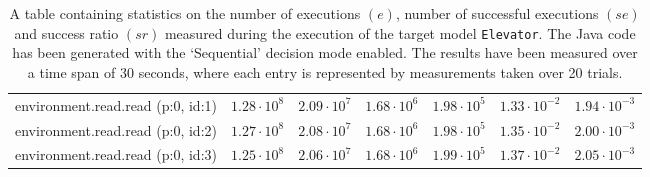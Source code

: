 \begin{table}[htbp]
{\begin{tabular}{lrrrrrr}
\hspace{3mm}environment.read.read (p:0, id:1) & $1.28 \cdot 10^{8}$ & $2.09 \cdot 10^{7}$ & $1.68 \cdot 10^{6}$ & $1.98 \cdot 10^{5}$ & $1.33 \cdot 10^{-2}$ & $1.94 \cdot 10^{-3}$ \\
\hspace{3mm}environment.read.read (p:0, id:2) & $1.27 \cdot 10^{8}$ & $2.08 \cdot 10^{7}$ & $1.68 \cdot 10^{6}$ & $1.98 \cdot 10^{5}$ & $1.35 \cdot 10^{-2}$ & $2.00 \cdot 10^{-3}$ \\
\hspace{3mm}environment.read.read (p:0, id:3) & $1.25 \cdot 10^{8}$ & $2.06 \cdot 10^{7}$ & $1.68 \cdot 10^{6}$ & $1.99 \cdot 10^{5}$ & $1.37 \cdot 10^{-2}$ & $2.05 \cdot 10^{-3}$ \\
\bottomrule
\end{tabular}
}
\caption{A table containing statistics on the number of executions $(e)$, number of successful executions $(se)$ and success ratio $(sr)$ measured during the execution of the target model \texttt{Elevator}. The Java code has been generated with the `Sequential' decision mode enabled. The results have been measured over a time span of 30 seconds, where each entry is represented by measurements taken over 20 trials.}
\label{table:frequency_results_elevator_sequential}
\end{table}